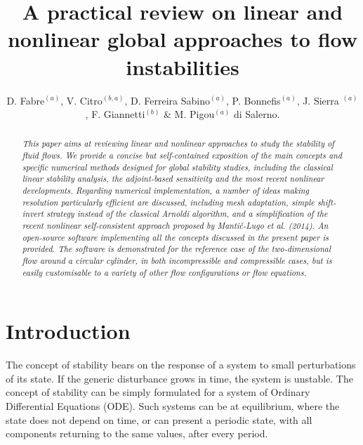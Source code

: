 \documentclass[twocolumn,10pt]{asme2ej}
\title{A practical review on linear and nonlinear global approaches to flow instabilities}
\author{D. Fabre$^{(a)}$,  V. Citro$^{(b,a)}$,  D. Ferreira Sabino$^{(a)}$, P. Bonnefis$^{(a)}$,  J. Sierra $^{(a)}$, F. Giannetti$^{(b)}$ \& M. Pigou$^{(a)}$ 
    \affiliation{
	$^{(a)}$ Institut de M\'ecanique des fluides de Toulouse (IMFT), University of Toulouse \\
	$^{(b)}$ Dipartimento di Ingegneria (DIIN), Universit\'a} di Salerno. 
}
\begin{document}
\lstset{numbers=left, numberstyle=\small, numbersep=8pt, frame = single, language=Matlab, framexleftmargin=15pt}

\maketitle    

\begin{abstract}
{\it 
This paper aims at reviewing linear and nonlinear approaches to study the stability of fluid flows. 
We provide a concise but self-contained exposition of the main concepts and specific numerical methods 
designed for global stability studies, including the classical linear stability analysis, the adjoint-based sensitivity and  
the most recent nonlinear developments. 
Regarding numerical implementation, a number of ideas making resolution particularly efficient are discussed, 
including mesh adaptation, simple shift-invert strategy instead of the classical Arnoldi algorithm, 
and a simplification of the recent nonlinear self-consistent approach proposed by Manti\v{c}-Lugo et al. (2014). 
An open-source software implementing all the concepts discussed in the present paper is provided. 
The software is demonstrated for the reference case of the two-dimensional flow around a circular cylinder, in both incompressible and compressible cases, but is easily customisable to a variety of other flow configurations or flow equations.
}
\end{abstract}



\section{Introduction}

The concept of stability bears on the response of a system to small perturbations of its state. If the generic disturbance grows in time, the system is unstable. The concept of stability can be simply formulated for a system of Ordinary Differential Equations (ODE). 
Such systems can be at equilibrium, where the state does not depend on time, or can present a periodic state, with all components returning to the same values, after every period. 
\end{document}
